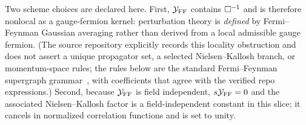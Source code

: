\begin{remark}\label{rem:gaugebv:ffscheme}
Two scheme choices are declared here. First, $\mathcal Y_{\rm FF}$ contains $\Box^{-1}$ and is therefore nonlocal as a gauge-fermion kernel: perturbation theory is \emph{defined} by Fermi--Feynman Gaussian averaging rather than derived from a local admissible gauge fermion. (The source repository explicitly records this locality obstruction and does not assert a unique propagator set, a selected Nielsen--Kallosh branch, or momentum-space rules; the rules below are the standard Fermi--Feynman supergraph grammar~\cite{GGRS}, with coefficients that agree with the verified repo expressions.) Second, because $\mathcal Y_{\rm FF}$ is field independent, $s\mathcal Y_{\rm FF}=0$ and the associated Nielsen--Kallosh factor is a field-independent constant in this slice; it cancels in normalized correlation functions and is set to unity.
\end{remark}


